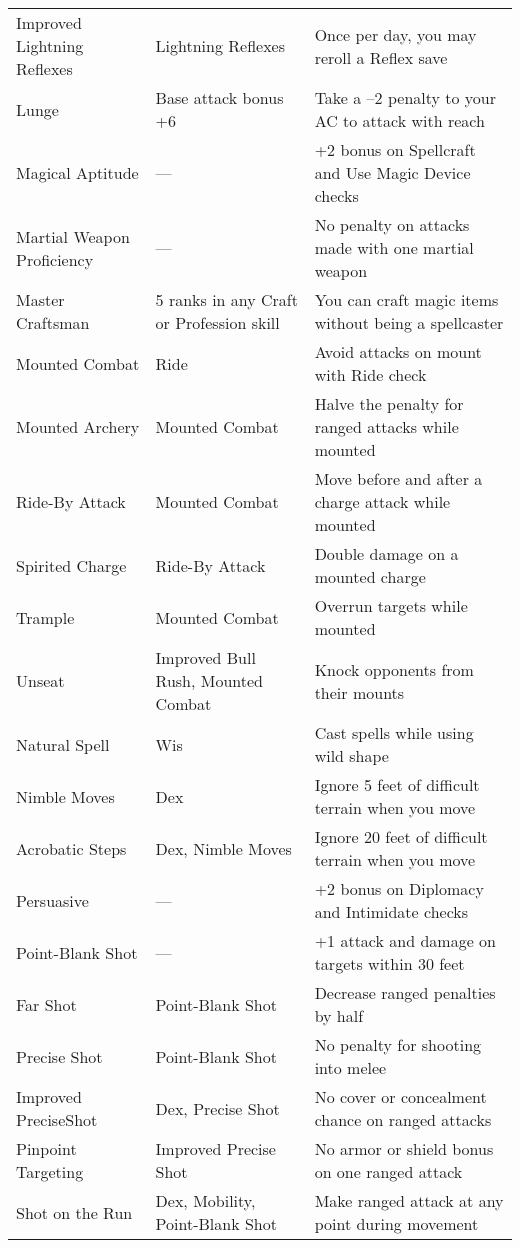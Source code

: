 \begin{table}[]
\begin{tabular}{lll}
\quad Improved Lightning Reflexes & Lightning Reflexes & Once per day, you may reroll a Reflex save\\
Lunge & Base attack bonus +6 & Take a –2 penalty to your AC to attack with reach\\
Magical Aptitude & — & +2 bonus on Spellcraft and Use Magic Device checks\\
Martial Weapon Proficiency & — & No penalty on attacks made with one martial weapon\\
Master Craftsman & 5 ranks in any Craft or Profession skill & You can craft magic items without being a spellcaster\\
Mounted Combat & Ride & Avoid attacks on mount with Ride check\\
\quad Mounted Archery & Mounted Combat & Halve the penalty for ranged attacks while mounted\\
\quad Ride-By Attack & Mounted Combat & Move before and after a charge attack while mounted\\
\quad \quad Spirited Charge & Ride-By Attack & Double damage on a mounted charge\\
\quad Trample & Mounted Combat & Overrun targets while mounted\\
\quad Unseat & Improved Bull Rush, Mounted Combat & Knock opponents from their mounts\\
Natural Spell & Wis & Cast spells while using wild shape\\
Nimble Moves & Dex & Ignore 5 feet of difficult terrain when you move\\
\quad Acrobatic Steps & Dex, Nimble Moves & Ignore 20 feet of difficult terrain when you move\\
Persuasive & — &  +2 bonus on Diplomacy and Intimidate checks\\
Point-Blank Shot & — & +1 attack and damage on targets within 30 feet\\
\quad Far Shot & Point-Blank Shot & Decrease ranged penalties by half\\
\quad Precise Shot & Point-Blank Shot & No penalty for shooting into melee\\
\quad \quad Improved PreciseShot & Dex, Precise Shot & No cover or concealment chance on ranged attacks\\
\quad  Pinpoint Targeting & Improved Precise Shot & No armor or shield bonus on one ranged attack\\
\quad Shot on the Run & Dex, Mobility, Point-Blank Shot & Make ranged attack at any point during movement\\

\end{tabular}
\end{table}
